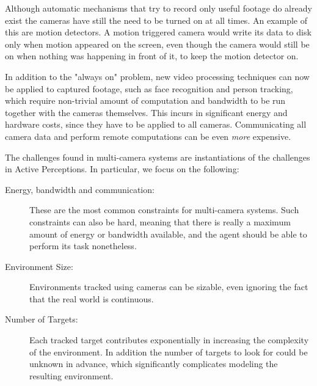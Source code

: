 Although automatic mechanisms that try to record only useful footage do already exist the cameras
have still the need to be turned on at all times. An example of this are motion detectors. A motion
triggered camera would write its data to disk only when motion appeared on the screen, even though
the camera would still be on when nothing was happening in front of it, to keep the motion detector
on.

In addition to the "always on" problem, new video processing techniques can now be applied to
captured footage, such as face recognition and person tracking, which require non-trivial amount of
computation and bandwidth to be run together with the cameras themselves. This incurs in significant
energy and hardware costs, since they have to be applied to all cameras. Communicating all camera
data and perform remote computations can be even \textit{more} expensive.

The challenges found in multi-camera systems are instantiations of the challenges in Active
Perceptions. In particular, we focus on the following:

\begin{description}
\item[Energy, bandwidth and communication:] These are the most common constraints for multi-camera
    systems. Such constraints can also be hard, meaning that there is really a maximum amount of
    energy or bandwidth available, and the agent should be able to perform its task nonetheless.
\item[Environment Size:] Environments tracked using cameras can be sizable, even ignoring the fact
    that the real world is continuous.
\item[Number of Targets:] Each tracked target contributes exponentially in increasing the complexity
    of the environment. In addition the number of targets to look for could be unknown in advance,
    which significantly complicates modeling the resulting environment.
\end{description}

%
%

